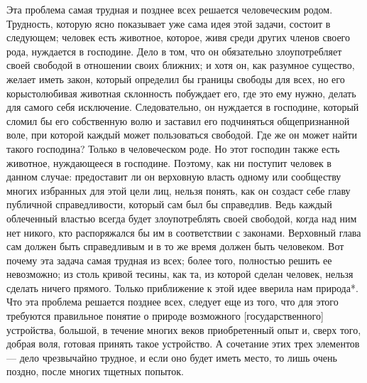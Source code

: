 \documentclass[a4paper]{book}
\begin{document}
Эта проблема самая трудная и позднее всех решается человеческим родом. Трудность, которую ясно показывает уже сама идея этой задачи, состоит в следующем; человек есть животное, которое, живя среди других членов своего рода, нуждается в господине. Дело в том, что он обязательно злоупотребляет своей свободой в отношении своих ближних; и хотя он, как разумное существо, желает иметь закон, который определил бы границы свободы для всех, но его корыстолюбивая животная склонность побуждает его, где это ему нужно, делать для самого себя исключение. Следовательно, он нуждается в господине, который сломил бы его собственную волю и заставил его подчиняться общепризнанной воле, при которой каждый может пользоваться свободой. Где же он может найти такого господина? Только в человеческом роде. Но этот господин также есть животное, нуждающееся в господине. Поэтому, как ни поступит человек в данном случае: предоставит ли он верховную власть одному или сообществу многих избранных для этой цели лиц, нельзя понять, как он создаст себе главу публичной справедливости, который сам был бы справедлив. Ведь каждый облеченный властью всегда будет злоупотреблять своей свободой, когда над ним нет никого, кто распоряжался бы им в соответствии с законами. Верховный глава сам должен быть справедливым и в то же время должен быть человеком. Вот почему эта задача самая трудная из всех; более того, полностью решить ее невозможно; из столь кривой тесины, как та, из которой сделан человек, нельзя сделать ничего прямого. Только приближение к этой идее вверила нам природа*. Что эта проблема решается позднее всех, следует еще из того, что для этого требуются правильное понятие о природе возможного [государственного] устройства, большой, в течение многих веков приобретенный опыт и, сверх того, добрая воля, готовая принять такое устройство. А сочетание этих трех элементов — дело чрезвычайно трудное, и если оно будет иметь место, то лишь очень поздно, после многих тщетных попыток.
\end{document}
